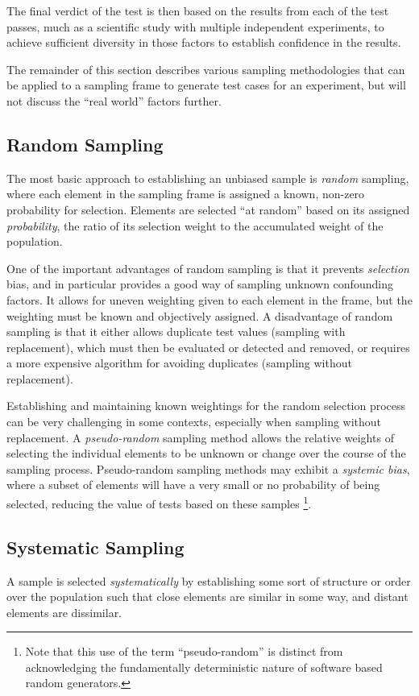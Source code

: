 \noindent
The final verdict of the test is then
based on the results from each of the test passes,
much as a scientific study with multiple independent experiments,
to achieve sufficient diversity in those factors to establish
confidence in the results.

The remainder of this section describes various sampling methodologies
that can be applied to a sampling frame to generate test cases for an experiment,
but will not discuss the ``real world'' factors further.

\subsection{Random Sampling}
The most basic approach to establishing an unbiased sample is \emph{random} sampling,
where each element in the sampling frame is assigned a known, 
non-zero probability for selection.
Elements are selected ``at random'' based on its assigned \emph{probability},
the ratio of its selection weight to the accumulated weight of the population.

One of the important advantages of random sampling is that 
it prevents \emph{selection} bias, 
and in particular provides a good way of sampling unknown confounding factors.
It allows for uneven weighting
given to each element in the frame,
but the weighting must be known and objectively assigned.
A disadvantage of random sampling is that it  either allows duplicate test values (sampling with replacement),
which must then be evaluated or detected and removed,
or requires a more expensive algorithm for avoiding duplicates (sampling without replacement).

Establishing and maintaining known weightings for the random selection process 
can be very challenging in some contexts,
especially when sampling without replacement.
A \emph{pseudo-random} sampling method allows
the relative weights of selecting the individual elements 
to be unknown or change over the course of the sampling process.
Pseudo-random sampling methods may exhibit a \emph{systemic bias},
where a subset of elements will have a very small or no probability of being selected,
reducing the value of tests based on these samples%
\footnote{Note that this use of the term ``pseudo-random'' is distinct from
acknowledging the fundamentally deterministic nature of 
software based random generators.}.

\subsection{Systematic Sampling}
A sample is selected \emph{systematically} by
establishing some sort of structure or order over the population such that 
close elements are similar in some way, 
and distant elements are dissimilar.

